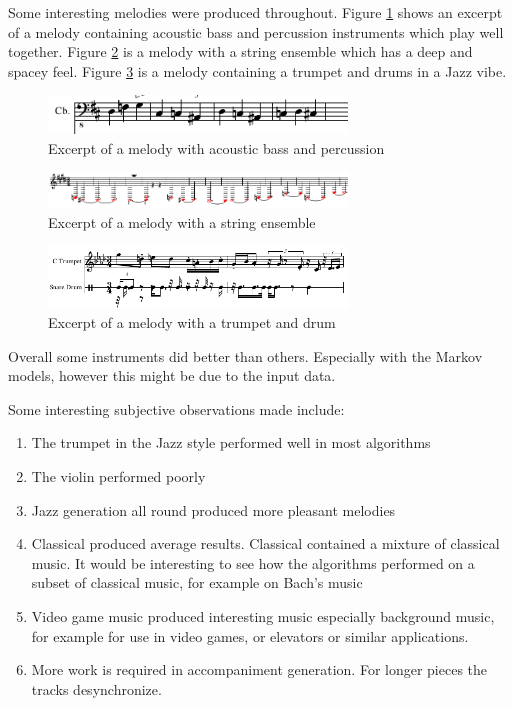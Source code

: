 Some interesting melodies were produced throughout. Figure \ref{ims:res_melody_bass_drum} shows an excerpt of a melody containing acoustic bass and percussion instruments which play well together. Figure \ref{ims:res_melody_string_spacey} is a melody with a string ensemble which has a deep and spacey feel. Figure \ref{ims:res_melody_trumpet_drum} is a melody containing a trumpet and drums in a Jazz vibe.

\begin{figure}
\centerline{\includegraphics[width=300px]{../images/res_melody_bass_drum.pdf}}
\caption{Excerpt of a melody with acoustic bass and percussion}
\label{ims:res_melody_bass_drum}
\end{figure}

\begin{figure}
\centerline{\includegraphics[width=300px]{../images/res_melody_spacey_string.pdf}}
\caption{Excerpt of a melody with a string ensemble}
\label{ims:res_melody_string_spacey}
\end{figure}

\begin{figure}
\centerline{\includegraphics[width=300px]{../images/res_melody_trumpet_drum.pdf}}
\caption{Excerpt of a melody with a trumpet and drum}
\label{ims:res_melody_trumpet_drum}
\end{figure}

Overall some instruments did better than others. Especially with the Markov models, however this might be due to the input data. 

Some interesting subjective observations made include:
\begin{enumerate}
\item The trumpet in the Jazz style performed well in most algorithms
\item The violin performed poorly
\item Jazz generation all round produced more pleasant melodies
\item Classical produced average results. Classical contained a mixture of classical music. It would be interesting to see how the algorithms performed on a subset of classical music, for example on Bach's music
\item Video game music produced interesting music especially background music, for example for use in video games, or elevators or similar applications.
\item More work is required in accompaniment generation. For longer pieces the tracks desynchronize.
\end{enumerate}

